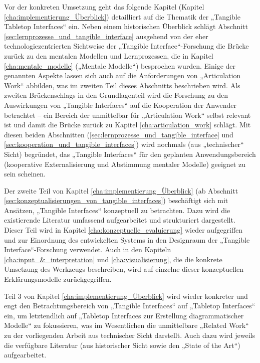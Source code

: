 Vor der konkreten Umsetzung geht das folgende Kapitel (Kapitel \ref{cha:implementierung_Überblick}) detailliert auf die Thematik der „Tangible Tabletop Interfaces“ ein. Neben einem historischen Überblick schlägt Abschnitt \ref{sec:lernprozesse_und_tangible_interface} ausgehend von der eher technologiezentrierten Sichtweise der „Tangible Interface“-Forschung die Brücke zurück zu den mentalen Modellen und Lernprozessen, die in Kapitel \ref{cha:mentale_modelle} („Mentale Modelle“) besprochen wurden. Einige der genannten Aspekte lassen sich auch auf die Anforderungen von „Articulation Work“ abbilden, was im zweiten Teil dieses Abschnitts beschrieben wird. Als zweiten Brückenschlags in den Grundlagenteil wird die Forschung zu den Auswirkungen von „Tangible Interfaces“ auf die Kooperation der Anwender betrachtet -- ein Bereich der unmittelbar für „Articulation Work“ selbst relevant ist und damit die Brücke zurück zu Kapitel \ref{cha:articulation_work} schlägt. Mit diesen beiden Abschnitten (\ref{sec:lernprozesse_und_tangible_interface} und \ref{sec:kooperation_und_tangible_interfaces}) wird nochmals (aus „technischer“ Sicht) begründet, das „Tangible Interfaces“ für den geplanten Anwendungsbereich (kooperative Externalisierung und Abstimmung mentaler Modelle) geeignet zu sein scheinen.

Der zweite Teil von Kapitel \ref{cha:implementierung_Überblick} (ab Abschnitt \ref{sec:konzeptualisierungen_von_tangible_interfaces}) beschäftigt sich mit Ansätzen, „Tangible Interfaces“ konzeptuell zu betrachten. Dazu wird die existierende Literatur umfassend aufgearbeitet und strukturiert dargestellt. Dieser Teil wird in Kapitel \ref{cha:konzeptuelle_evaluierung} wieder aufgegriffen und zur Einordnung des entwickelten Systems in den Designraum der „Tangible Interface“-Forschung verwendet. Auch in den Kapiteln \ref{cha:input_&_interpretation} und \ref{cha:visualisierung}, die die konkrete Umsetzung des Werkzeugs beschreiben, wird auf einzelne dieser konzeptuellen Erklärungsmodelle zurückgegriffen.

Teil 3 von Kapitel \ref{cha:implementierung_Überblick} wird wieder konkreter und engt den Betrachtungsbereich von „Tangible Interfaces“ auf „Tabletop Interfaces“ ein, um letztendlich auf „Tabletop Interfaces zur Erstellung diagrammatischer Modelle“ zu fokussieren, was im Wesentlichen die unmittelbare „Related Work“ zu der vorliegenden Arbeit aus technischer Sicht darstellt. Auch dazu wird jeweils die verfügbare Literatur (aus historischer Sicht sowie den „State of the Art“) aufgearbeitet.

